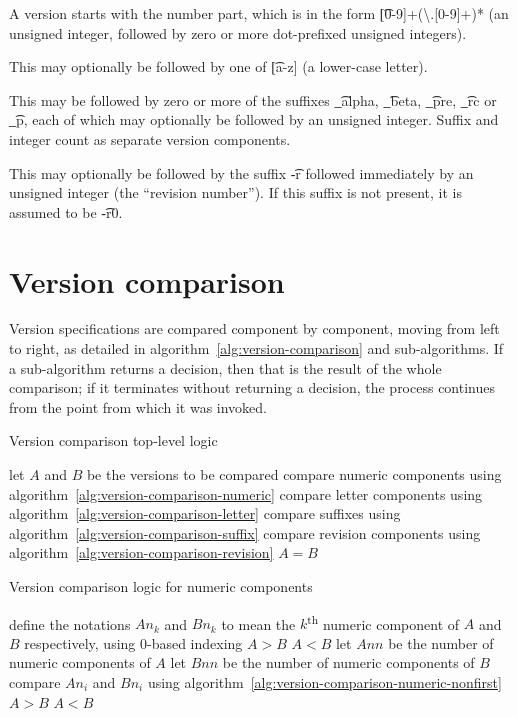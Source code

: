 A version starts with the number part, which is in the form \t{[0-9]+(\textbackslash.[0-9]+)*}
(an unsigned integer, followed by zero or more dot-prefixed unsigned integers).

This may optionally be followed by one of \t{[a-z]} (a lower-case letter).

This may be followed by zero or more of the suffixes \t{_alpha}, \t{_beta}, \t{_pre}, \t{_rc}
or \t{_p}, each of which may optionally be followed by an unsigned integer. Suffix and integer
count as separate version components.

This may optionally be followed by the suffix \t{-r} followed immediately by an unsigned integer
(the ``revision number''). If this suffix is not present, it is assumed to be \t{-r0}.

\section{Version comparison}

Version specifications are compared component by component, moving from left to right,
as detailed in algorithm~\ref{alg:version-comparison} and sub-algorithms.
If a sub-algorithm returns a decision, then that is the result of the whole comparison;
if it terminates without returning a decision, the process continues from the point
from which it was invoked.

\begin{algorithm}[p]
\caption{Version comparison top-level logic} \label{alg:version-comparison}
\begin{algorithmic}[1]
    \STATE let $A$ and $B$ be the versions to be compared
    \STATE compare numeric components using algorithm~\ref{alg:version-comparison-numeric}
    \STATE compare letter components using algorithm~\ref{alg:version-comparison-letter}
    \STATE compare suffixes using algorithm~\ref{alg:version-comparison-suffix}
    \STATE compare revision components using algorithm~\ref{alg:version-comparison-revision}
    \RETURN $A=B$
\end{algorithmic}
\end{algorithm}

\begin{algorithm}[p]
\caption{Version comparison logic for numeric components} \label{alg:version-comparison-numeric}
\begin{algorithmic}[1]
  \STATE define the notations $An_k$ and $Bn_k$ to mean the $k$\textsuperscript{th} numeric
      component of $A$ and $B$ respectively, using $0$-based indexing
    \RETURN $A>B$
    \RETURN $A<B$
  \ENDIF
  \STATE let $Ann$ be the number of numeric components of $A$
  \STATE let $Bnn$ be the number of numeric components of $B$
    \STATE compare $An_i$ and $Bn_i$ using algorithm~\ref{alg:version-comparison-numeric-nonfirst}
  \ENDFOR
    \RETURN $A>B$
    \RETURN $A<B$
  \ENDIF
\end{algorithmic}
\end{algorithm}

